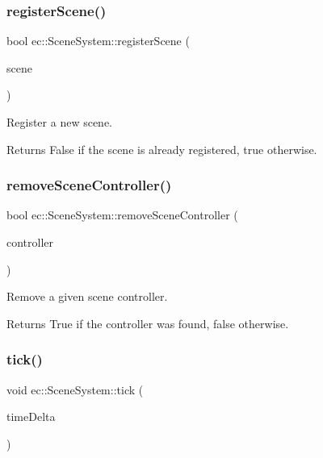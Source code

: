 \subsubsection{\texorpdfstring{register\+Scene()}{registerScene()}}
{\footnotesize\ttfamily bool ec\+::\+Scene\+System\+::register\+Scene (\begin{DoxyParamCaption}\item[{\mbox{\hyperlink{classec_1_1_scene}{Scene}} $\ast$}]{scene }\end{DoxyParamCaption})}



Register a new scene. 

\begin{DoxyReturn}{Returns}
False if the scene is already registered, true otherwise. 
\end{DoxyReturn}
\mbox{\label{classec_1_1_scene_system_ad15260128496d698ad43c2632e2dc7b4}} 
\subsubsection{\texorpdfstring{remove\+Scene\+Controller()}{removeSceneController()}}
{\footnotesize\ttfamily bool ec\+::\+Scene\+System\+::remove\+Scene\+Controller (\begin{DoxyParamCaption}\item[{\mbox{\hyperlink{classec_1_1_scene_controller}{Scene\+Controller}} $\ast$}]{controller }\end{DoxyParamCaption})}



Remove a given scene controller. 

\begin{DoxyReturn}{Returns}
True if the controller was found, false otherwise. 
\end{DoxyReturn}
\mbox{\label{classec_1_1_scene_system_a5a858b4c58f53b04d7796e364351b825}} 
\subsubsection{\texorpdfstring{tick()}{tick()}}
{\footnotesize\ttfamily void ec\+::\+Scene\+System\+::tick (\begin{DoxyParamCaption}\item[{float}]{time\+Delta }\end{DoxyParamCaption})}



